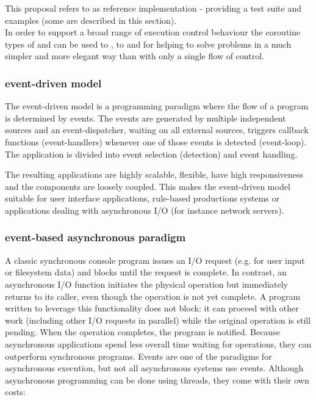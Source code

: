 
This proposal refers to \boostcoroutine as reference implementation - providing
a test suite and examples (some are described in this section).\\
\newline
In order to support a broad range of execution control behaviour the coroutine
types of \scoro and \acoro can be used to \escrecloops, to \escreccomps and for
\coopmultitasking helping to solve problems in a much simpler and more elegant
way than with only a single flow of control.

\subsubsection*{event-driven model}
The event-driven model is a programming paradigm where the flow of a program is
determined by events. The events are generated by multiple independent sources
and an event-dispatcher, waiting on all external sources, triggers callback
functions (event-handlers) whenever one of those events is detected (event-loop).
The application is divided into event selection (detection) and event handling.

The resulting applications are highly scalable, flexible, have high
responsiveness and the components are loosely coupled. This makes the event-driven
model suitable for user interface applications, rule-based productions systems
or applications dealing with asynchronous I/O (for instance network servers).


\subsubsection*{event-based asynchronous paradigm}
A classic synchronous console program issues an I/O request (e.g. for user
input or filesystem data) and blocks until the request is complete.
\newline
In contrast, an asynchronous I/O function initiates the physical operation but
immediately returns to its caller, even though the operation is not yet
complete. A program written to leverage this functionality does not block: it
can proceed with other work (including other I/O requests in parallel) while
the original operation is still pending. When the operation completes, the
program is notified. Because asynchronous applications spend less overall time
waiting for operations, they can outperform synchronous programs.
\newline
Events are one of the paradigms for asynchronous execution, but
not all asynchronous systems use events.
Although asynchronous programming can be done using threads, they come with
their own costs:

